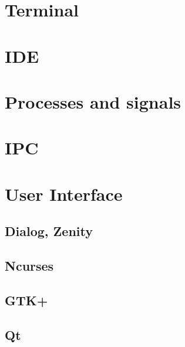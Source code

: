 \section{Terminal}
\label{sec:terminal}

\section{IDE}
\label{sec:ide}


\section{Processes and signals}
\label{sec:processes-signals}

\section{IPC}
\label{sec:ipc}

\section{User Interface}
\label{sec:ui}

\subsection{Dialog, Zenity}
\label{sec:dialog}

\subsection{Ncurses}
\label{sec:curses}

\subsection{GTK+}
\label{sec:gtk+}

\subsection{Qt}
\label{sec:qt}



